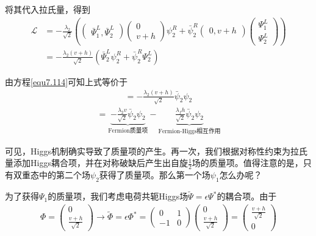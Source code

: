 将其代入拉氏量，得到
\begin{align*}
\mathscr{L}&=-\frac{\lambda_2}{\sqrt{2}}\left(\begin{pmatrix}\bar{\Psi}_1^L,\bar{\Psi}^L_2\end{pmatrix}\begin{pmatrix}0 \\ v+h\end{pmatrix}\psi^R_2+\bar{\psi}^R_2\begin{pmatrix}0,v+h\end{pmatrix}\begin{pmatrix}\Psi^L_1 \\ \Psi^L_2\end{pmatrix}\right)\nonumber\\
&=-\frac{\lambda_2(v+h)}{\sqrt{2}}(\bar{\Psi}_2^L\psi_2^R+\bar{\psi}^R_2\Psi^L_2)
\end{align*}

由方程\ref{equ7.114}可知上式等价于
\begin{align}
=-\frac{\lambda_2(v+h)}{\sqrt{2}}\bar{\psi}_2\psi_2
\label{equ7.118}
\end{align}
\begin{align}
=\underbrace{-\frac{\lambda_2v}{\sqrt{2}}\bar{\psi}_2\psi_2}_\text{Fermion质量项}-\underbrace{\frac{\lambda_fh}{\sqrt{2}}\bar{\psi}_2\psi_2}_\text{Fermion-Higgs相互作用}
\label{equ7.119}
\end{align}

可见，Higgs机制确实导致了质量项的产生。再一次，我们根据对称性约束为拉氏量添加Higgs耦合项，并在对称破缺后产生出自旋$\frac{1}{2}$场的质量项。值得注意的是，只有双重态中的第二个场$\psi_2$获得了质量项。那么第一个场$\psi_1$怎么办呢？

为了获得$\Psi_1$的质量项，我们考虑电荷共轭Higgs场$\tilde{\Psi}=\epsilon\Psi^*$的耦合项。由于
\begin{align}
\Phi=\begin{pmatrix}0 \\ \frac{v+h}{\sqrt{2}}\end{pmatrix}\rightarrow\tilde{\Phi}=\epsilon\Phi^*=\begin{pmatrix}0 & 1 \\ -1 & 0\end{pmatrix}\begin{pmatrix}0 \\ \frac{v+h}{\sqrt{2}}\end{pmatrix}=\begin{pmatrix} \frac{v+h}{\sqrt{2}} \\ 0\end{pmatrix}
\label{equ7.120}
\end{align}

